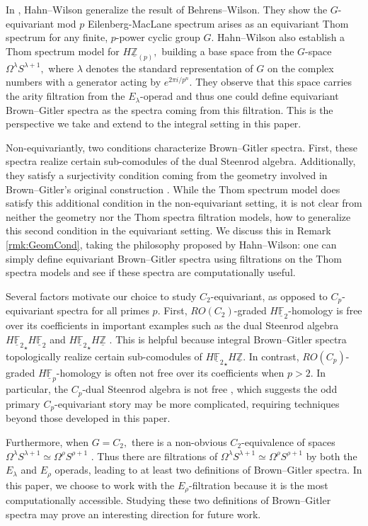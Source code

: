 \documentclass[]{amsart}  %
\theoremstyle{definition}
\numberwithin{equation}{section}
\numberwithin{figure}{section}
\newcommand{\mF}{{\mathbb F}}
\newcommand{\mZ}{{\mathbb Z}}
\newcommand{\umF}{\underline{\mF}}
\newcommand{\umZ}{\underline{\mZ}}
\newcommand{\0}{\langle 0 \rangle}
\begin{document}
In \cite{HW2020}, Hahn--Wilson generalize the result of Behrens--Wilson. They show the $G$-equivariant mod $p$ Eilenberg-MacLane spectrum arises as an equivariant Thom spectrum for any finite, $p$-power cyclic group $G.$ Hahn--Wilson also establish a Thom spectrum model for $H \umZ_{(p)},$ building a base space from  the $G$-space $\Omega^\lambda S^{\lambda + 1},$ where $\lambda$ denotes the standard representation of $G$ on the complex numbers with a generator acting by $e^{2\pi i / p^n}.$ They observe that this space carries the arity filtration from the $E_\lambda$-operad and thus one could define equivariant Brown--Gitler spectra as the spectra coming from this filtration. This is the perspective we take and extend to the integral setting in this paper. 

Non-equivariantly, two conditions characterize Brown--Gitler spectra. First, these spectra realize certain sub-comodules of the dual Steenrod algebra. Additionally, they satisfy a surjectivity condition coming from the geometry involved in Brown--Gitler's original construction \cite{brown1973spectrum}. While the Thom spectrum model does satisfy this additional condition in the non-equivariant setting, it is not clear from neither the geometry nor the Thom spectra filtration models, 
how to generalize this second condition in the equivariant setting. We discuss this in Remark \ref{rmk:GeomCond}, taking the philosophy proposed by Hahn--Wilson: one can simply define equivariant Brown--Gitler spectra using filtrations on the Thom spectra models and see if these spectra are computationally useful. 

Several factors motivate our choice to study $C_2$-equivariant, as opposed to $C_p$-equivariant spectra for all primes $p$. First, $RO(C_2)$-graded $H \umF_2$-homology is free over its coefficients in important examples such as the dual Steenrod algebra \\ ${H \umF_2}_\star H \umF_2$ \cite{HuKriz2001} and ${H \umF_2}_\star H \umZ$ \cite{Ormsby2011}. This is helpful because integral Brown--Gitler spectra topologically realize certain sub-comodules of ${H \umF_2}_\star H \umZ$. In contrast, $RO(C_p)$-graded $H \umF_p$-homology is often not free over its coefficients when $p > 2.$ In particular, the $C_p$-dual Steenrod algebra is not free \cite{SanW2il022}, which suggests the odd primary $C_p$-equivariant story may be more complicated, requiring techniques beyond those developed in this paper. 

Furthermore, when $G = C_2,$ there is a non-obvious $C_2$-equivalence of spaces $\Omega^\lambda S^{\lambda + 1} \simeq \Omega^\rho S^{\rho + 1}$ \cite{HW2020}. Thus there are filtrations of $\Omega^\lambda S^{\lambda + 1} \simeq \Omega^\rho S^{\rho + 1}$ by both the $E_\lambda$ and $E_\rho$ operads, leading to at least two definitions of Brown--Gitler spectra.  In this paper, we choose to work with the $E_\rho$-filtration because it is the most computationally accessible. Studying these two definitions of Brown--Gitler spectra may prove an interesting direction for future work.
\end{document}

